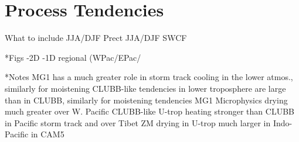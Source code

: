 \section{Process Tendencies}

What to include
JJA/DJF Prect
JJA/DJF SWCF


*Figs
-2D
-1D regional (WPac/EPac/

*Notes
MG1 has a much greater role in storm track cooling in the lower atmos., similarly for moistening
CLUBB-like tendencies in lower troposphere are large than in CLUBB, similarly for moistening tendencies
MG1 Microphysics drying much greater over W. Pacific
CLUBB-like U-trop heating stronger than CLUBB in Pacific storm track and over Tibet
ZM drying in U-trop much larger in Indo-Pacific in CAM5
